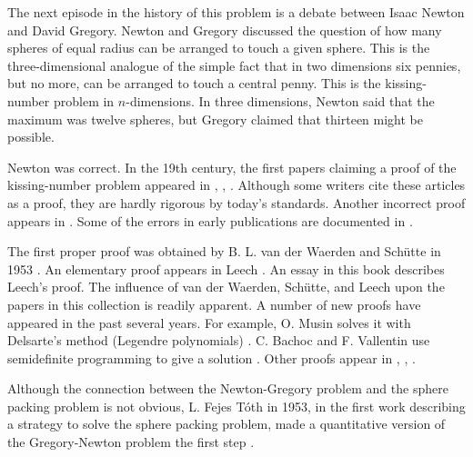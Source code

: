 \label{sec:history}

The next episode in the history of this problem is a debate between
Isaac Newton and David Gregory.  Newton and Gregory discussed the
question of how many spheres of equal radius can be arranged to
touch a given sphere.  This is the three-dimensional analogue of the
simple fact that in two dimensions six pennies, but no more, can be
arranged to touch a central penny.  This is the kissing-number
problem in $n$-dimensions. In three dimensions, Newton said that the
maximum was twelve spheres, but Gregory claimed that thirteen might
be possible.

Newton was correct.
In the 19th century, the first papers claiming a proof of the
kissing-number problem appeared
in \cite{Ben74}, \cite{Gun75}, \cite{Hop74}.
Although some writers cite these articles
as a proof, they are hardly rigorous by today's standards.
Another incorrect
proof appears in \cite{Boe52}.  
Some of the errors in early publications are documented in \cite{Hal94}.

  The first proper proof was obtained
by B. L. van der Waerden 
and Sch\"utte  in 1953 \cite{Sch53}.
An elementary proof appears in Leech \cite{Lee56}.
An essay in this book describes Leech's proof.
The influence of van der Waerden, Sch\"utte, and Leech upon the
papers in this collection is readily apparent. 
A number of new proofs have appeared in the past several years.  
For example, O. Musin solves it
with Delsarte's method (Legendre polynomials) \cite{Mus06}.  C. Bachoc and F. Vallentin use semidefinite
programming to give a solution \cite{BV06}.  
Other proofs appear in 
\cite{Mae01}, \cite{Ans02},  \cite{Bor03}.   

 Although the
connection between the Newton-Gregory problem and the sphere packing problem
is not obvious, L. Fejes T\'oth 
in 1953, in the first
work describing a strategy to solve the sphere packing problem, made
a quantitative version of the Gregory-Newton problem the first step
\cite{Fej53}.


